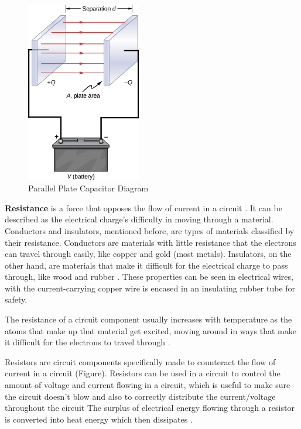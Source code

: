 \documentclass[12pt]{article}
\begin{document}
\begin{figure}[H]
    \centering
    \includegraphics[width=5cm]{parallel plate capacitor.jpg}
    \caption{\centering \footnotesize{Parallel Plate Capacitor Diagram \protect\cite{librecapacitance}}}
    \label{fig:ppcapacitor}
\end{figure}

\textbf{Resistance} is a force that opposes the flow of current in a circuit
\cite{flukeresistance,hiokiresistance,britresistance}.
It can be described as the electrical charge's difficulty in moving through a material.
\cite{hiokiresistance}
Conductors and insulators, mentioned before, are types of materials classified by their resistance. Conductors are materials with little resistance that the
electrons can travel through easily, like copper and gold (most metals). Insulators, on the other hand, are materials that make it difficult for the electrical
charge to pass through, like wood and rubber
\cite{flukeresistance}.
These properties can be seen in electrical wires, with the current-carrying copper wire is encased in an insulating rubber tube for safety.

The resistance of a circuit component usually increases with temperature as the atoms that make up that material get excited, moving around in ways that make it
difficult for the electrons to travel through
\cite{britresistance,bbcresistance}.

Resistors are circuit components specifically made to counteract the flow of current in a circuit
\cite{britresistor,bbcresistance,hiokiresistance} (Figure).
Resistors can be used in a circuit to control the amount of voltage and current flowing in a circuit, which is useful to make sure the circuit doesn't blow and also
to correctly distribute the current/voltage throughout the circuit
\cite{britresistor,hiokiresistance}
The surplus of electrical energy flowing through a resistor is converted into heat energy which then dissipates
\cite{hiokiresistance}.
\end{document}
